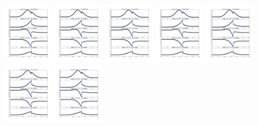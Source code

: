 \documentclass[11pt]{article}
\begin{document}
\vskip 10pt 
\includegraphics[width=0.19\textwidth]{frame0125fig1.png}
\vskip 10pt 
\includegraphics[width=0.19\textwidth]{frame0126fig1.png}
\vskip 10pt 
\includegraphics[width=0.19\textwidth]{frame0127fig1.png}
\vskip 10pt 
\includegraphics[width=0.19\textwidth]{frame0128fig1.png}
\vskip 10pt 
\includegraphics[width=0.19\textwidth]{frame0129fig1.png}
\vskip 10pt 
\includegraphics[width=0.19\textwidth]{frame0130fig1.png}
\vskip 10pt 
\includegraphics[width=0.19\textwidth]{frame0131fig1.png}
\end{document}
